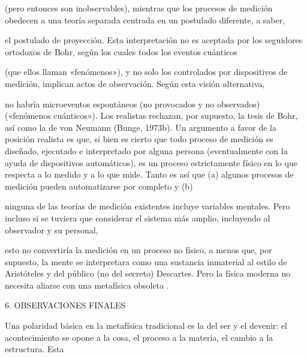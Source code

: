 \begin{justifying}
\begin{justifying}
(pero entonces son inobservables), mientras que los procesos de medición
obedecen a una teoría separada centrada en un postulado diferente, a saber,

el postulado de proyección. Esta interpretación no es aceptada por los
seguidores ortodoxos de Bohr, según los cuales todos los eventos cuánticos

(que ellos llaman «fenómenos»), y no solo los controlados por dispositivos de medición,
implican actos de observación. Según esta visión alternativa,

 no habría microeventos espontáneos (no provocados y no observados)
(«fenómenos cuánticos»). Los realistas rechazan, por supuesto, la tesis de Bohr,
 así como la de von Neumann (Bunge, 1973b). Un argumento a favor de la
posición realista es que, si bien es cierto que todo proceso de medición es
   \noindent
\bigskip
diseñado, ejecutado e interpretado por alguna persona (eventualmente con la
ayuda de dispositivos automáticos), es un proceso estrictamente físico en lo que respecta a
lo medido y a lo que mide. Tanto es así que (a)
algunos procesos de medición pueden automatizarse por completo y (b)

ninguna de las teorías de medición existentes incluye variables mentales.
 Pero incluso si se tuviera que considerar el sistema más amplio, incluyendo al observador y su personal,

 esto no convertiría la medición en un proceso no físico,
a menos que, por supuesto, la mente se interpretara como una sustancia inmaterial
al estilo de Aristóteles y del público (no del secreto)
Descartes. Pero la física moderna no necesita aliarse con una metafísica obsoleta
.
\noindent
\vspace{0.3cm}
\begin{center}
    \normalsize 6. OBSERVACIONES FINALES
    \end{center}
   \bigskip
   Una polaridad básica en la metafísica tradicional es la del ser y el devenir:
el acontecimiento se opone a la cosa, el proceso a la materia, el cambio a la estructura. Esta


\end{justifying}
\end{justifying}
